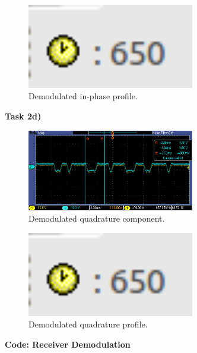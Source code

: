 \documentclass{article}
\begin{document}
\begin{figure}[h]
  \begin{center}
    \includegraphics[width=0.65\textwidth]{img/task_2_c_profile.png}
    \caption{Demodulated in-phase profile.}
  \end{center}
\end{figure}

\pagebreak
\textbf{Task 2d)}

\begin{figure}[h]
  \begin{center}
    \includegraphics[width=0.65\textwidth]{img/task_2_c_oscilloscope.png}
    \caption{Demodulated quadrature component.}
  \end{center}
\end{figure}

\begin{figure}[h]
  \begin{center}
    \includegraphics[width=0.65\textwidth]{img/task_2_c_profile.png}
    \caption{Demodulated quadrature profile.}
  \end{center}
\end{figure}

\pagebreak
\textbf{Code: Receiver Demodulation}
\end{document}
